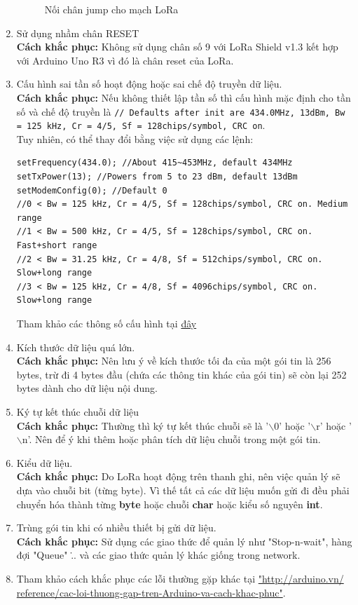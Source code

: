 \begin{enumerate}
\begin{center}
\begin{figure}[htp]
\begin{center}
\end{center}
\caption{Nối chân jump cho mạch LoRa}
\label{pinjump}
\end{figure}
\end{center}
\item Sử dụng nhầm chân RESET\\
\textbf{Cách khắc phục:} Không sử dụng chân số 9 với LoRa Shield v1.3 kết hợp với Arduino Uno R3 vì đó là chân reset của LoRa.
\item Cấu hình sai tần số hoạt động hoặc sai chế độ truyền dữ liệu.\\
\textbf{Cách khắc phục:} Nếu không thiết lập tần số thì cấu hình mặc định cho tần số và chế độ truyền là \lstinline{// Defaults after init are 434.0MHz, 13dBm, Bw = 125 kHz, Cr = 4/5, Sf = 128chips/symbol, CRC on}.\\
Tuy nhiên, có thể thay đổi bằng việc sử dụng các lệnh:
\begin{lstlisting}[label={list:sixth},caption=Các lệnh để thiết lập cấu hình]
setFrequency(434.0); //About 415~453MHz, default 434MHz
setTxPower(13); //Powers from 5 to 23 dBm, default 13dBm
setModemConfig(0); //Default 0
//0 < Bw = 125 kHz, Cr = 4/5, Sf = 128chips/symbol, CRC on. Medium range
//1 < Bw = 500 kHz, Cr = 4/5, Sf = 128chips/symbol, CRC on. Fast+short range
//2 < Bw = 31.25 kHz, Cr = 4/8, Sf = 512chips/symbol, CRC on. Slow+long range
//3 < Bw = 125 kHz, Cr = 4/8, Sf = 4096chips/symbol, CRC on. Slow+long range
\end{lstlisting}
Tham khảo các thông số cấu hình tại \href{https://www.semtech.com/uploads/documents/LoraDesignGuide\_STD.pdf}{đây} \cite{tl17}
\item Kích thước dữ liệu quá lớn.\\
\textbf{Cách khắc phục:} Nên lưu ý về kích thước tối đa của một gói tin là 256 bytes, trừ đi 4 bytes đầu (chứa các thông tin khác của gói tin) sẽ còn lại 252 bytes dành cho dữ liệu nội dung.
\item Ký tự kết thúc chuỗi dữ liệu\\
\textbf{Cách khắc phục:} Thường thì ký tự kết thúc chuỗi sẽ là '$\backslash$0' hoặc '$\backslash$r' hoặc '$\backslash$n'. Nên để ý khi thêm hoặc phân tích dữ liệu chuỗi trong một gói tin.
\item Kiểu dữ liệu.\\
\textbf{Cách khắc phục:} Do LoRa hoạt động trên thanh ghi, nên việc quản lý sẽ dựa vào chuỗi bit (từng byte). Vì thế tất cả các dữ liệu muốn gửi đi đều phải chuyển hóa thành từng \textbf{byte} hoặc chuỗi \textbf{char} hoặc kiểu số nguyên \textbf{int}.
\item Trùng gói tin khi có nhiều thiết bị gửi dữ liệu.\\
\textbf{Cách khắc phục:} Sử dụng các giao thức để quản lý như "Stop-n-wait", hàng đợi "Queue" \... và các giao thức quản lý khác giống trong network. 
\item Tham khảo cách khắc phục các lỗi thường gặp khác tại  \href{http://arduino.vn/reference/cac-loi-thuong-gap-tren-Arduino-va-cach-khac-phuc}{"http://arduino.vn/ reference/cac-loi-thuong-gap-tren-Arduino-va-cach-khac-phuc"}.
\end{enumerate}
\newpage
